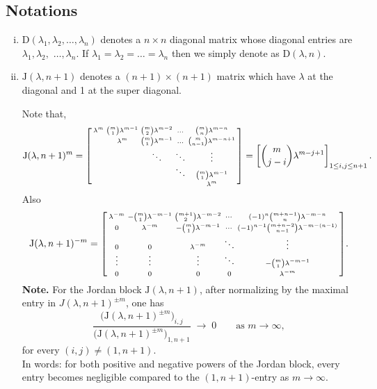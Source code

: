 \documentclass[12pt,reqno]{amsart}
\numberwithin{equation}{section}
\theoremstyle{definition}
\begin{document}
    	\subsection{Notations}\label{notations}
    	\begin{enumerate}[(i)]
		\item  $\mathrm{D}(\lambda_1,\lambda_2,\ldots,\lambda_n)$ denotes a $n\times n$ diagonal matrix whose diagonal entries are $\lambda_1,\lambda_2,$ $\ldots,\lambda_n$.
		If $\lambda_1=\lambda_2=\ldots=\lambda_n$ then we simply denote as $\mathrm{D}(\lambda,n)$.
		\item $ \mathrm{J}(\lambda,n+1)$ denotes a $(n+1)\times (n+1)$ matrix which have $\lambda$ at the diagonal and 1 at the super diagonal.
		\par Note that, 
		\begin{equation*}
			\mathrm{J}(\lambda,n+1)^m=\begin{bsmallmatrix}
				\lambda^m & {m \choose 1}\lambda^{m-1} & {m \choose 2}\lambda^{m-2} & \ldots & {m \choose n}\lambda^{m-n}\\&  \lambda^m & {m \choose 1}\lambda^{m-1} & \ldots & {m \choose n-1}\lambda^{m-n+1}\\ &   & \ddots & \ddots & \vdots\\
				&   & &\ddots & {m \choose 1}\lambda^{m-1}  \\ & &   &  & \lambda^m 
			\end{bsmallmatrix}=\left[ {m\choose j-i}\lambda^{m-j+1}\right]_{1\leq i,j\leq n+1}.
		\end{equation*}
        Also
        \begin{equation*}
\mathrm{J}(\lambda,n+1)^{-m}
=
\begin{bsmallmatrix}
\lambda^{-m} & -\binom{m}{1}\lambda^{-m-1} & \binom{m+1}{2}\lambda^{-m-2} & \cdots & (-1)^n \binom{m+n-1}{n} \lambda^{-m-n} \\
0 & \lambda^{-m} & -\binom{m}{1}\lambda^{-m-1} & \cdots & (-1)^{n-1} \binom{m+n-2}{n-1} \lambda^{-m-(n-1)} \\
0 & 0 & \lambda^{-m} & \ddots & \vdots \\
\vdots & \vdots & \vdots & \ddots & -\binom{m}{1}\lambda^{-m-1} \\
0 & 0 & 0 & 0 & \lambda^{-m}
\end{bsmallmatrix}.
        \end{equation*}
       \textbf{Note.}
For the Jordan block \(\mathrm{J}(\lambda,n+1)\), after normalizing by the maximal
entry in \(J(\lambda,n+1)^{\pm m}\), one has
\[
\frac{\bigl(\mathrm{J}(\lambda,n+1)^{\pm m}\bigr)_{i,j}}
     {\bigl(\mathrm{J}(\lambda,n+1)^{\pm m}\bigr)_{1,n+1}}
\;\longrightarrow\; 0
\qquad \text{as } m\to\infty,
\]
for every \((i,j)\neq (1,n+1)\).\\
In words: for both positive and negative powers of the Jordan block,
every entry becomes negligible compared to the \((1,n+1)\)-entry
as \(m\to\infty\).\\


\end{enumerate}
\end{document}
